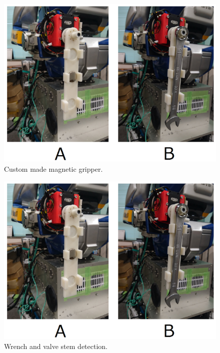 \documentclass{standalone}
\begin{document}
\begin{figure}
  \includegraphics{sections/task2/images/figure2}
  \caption{Custom made magnetic gripper.}
  \label{fig:figure2}
\end{figure}

\begin{figure}
  \includegraphics{sections/task2/images/figure3}
  \caption{Wrench and valve stem detection.}
  \label{fig:figure3}
\end{figure}
\end{document}
